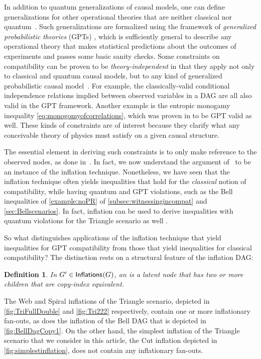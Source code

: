 \documentclass[aps,english,10pt,superscriptaddress,onecolumn,twoside,longbibliography,pra,floatfix,fleqn,nofootinbib]{revtex4-1}%
\newcommand*{\tblue}[1]{{\color{MidnightBlue}{\textbf{#1}}}}
\newtheorem{definition}[theorem]{Definition}
\theoremstyle{definition}
\newcounter{example}[section]
\newcommand{\SmallNamedFunction}[3][]{\operatorname{\mathsf{#2}}_{#1}\parenths{#3}}
\newcommand{\inflations}[1]{\SmallNamedFunction{Inflations}{#1}}
\DeclarePairedDelimiter{\parenths}{\lparen}{\rparen}
\begin{document}
In addition to quantum generalizations of causal models, one can define generalizations for other operational theories that are neither classical nor quantum~\cite{pusey2014gdag,BeyondBellII}.
Such generalizations are formalized using the framework of {\em generalized probabilistic theories} (GPTs) \cite{Barnum2012GPT,Janotta2014GPT}, which is sufficiently general to describe any operational theory that makes statistical predictions about the outcomes of experiments and passes some basic sanity checks.  Some constraints on compatibility can be proven to be \emph{theory-independent} in that they apply not only to classical and quantum causal models, but to any kind of generalized probabilistic causal model~\cite{pusey2014gdag}. For example, the classically-valid conditional independence relations implied between observed variables in a DAG are all also valid in the GPT framework.
Another example is the entropic monogamy inequality \cref{eq:monogomyofcorrelations}, which was proven in \cite{pusey2014gdag} to be GPT valid as well. These kinds of constraints are of interest because they clarify what any conceivable theory of physics must satisfy on a given causal structure. 

The essential element in deriving such constraints is to only make reference to the observed nodes, as done in~\cite{pusey2014gdag}. In fact, we now understand the argument of~\cite{pusey2014gdag} to be an instance of the inflation technique. Nonetheless, we have seen that the inflation technique often yields inequalities that hold for the {\em classical} notion of compatibility, while having quantum and GPT violations, such as the Bell inequalities of \cref{example:noPR} of \cref{subsec:witnessingincompat} and \cref{sec:Bellscenarios}. In fact, inflation can be used to derive inequalities with quantum violations for the Triangle scenario as well \cite{TC2016trianglequantum}.

So what distinguishes applications of the inflation technique that yield inequalities for GPT compatibility from those that yield inequalities for classical compatibility?   The distinction rests on a structural feature of the inflation DAG:


\begin{definition}
In $G'\in\inflations{G}$, an \tblue{inflationary fan-out} is a latent node that has two or more children that are copy-index equivalent.  
\end{definition}

 The Web and Spiral inflations of the Triangle scenario, depicted in \cref{fig:TriFullDouble} and \cref{fig:Tri222} respectively,
contain one or more inflationary fan-outs, as does the inflation of the Bell DAG that is depicted in \cref{fig:BellDagCopy1}.  On the other hand, the simplest inflation of the Triangle scenario that we consider in this article, the Cut inflation depicted in \cref{fig:simplestinflation}, does not contain any inflationary fan-outs.
\end{document}
